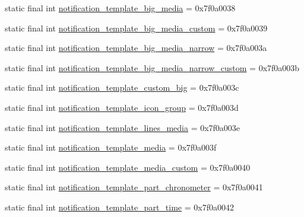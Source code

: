 \begin{DoxyCompactItemize}
\item 
static final int \mbox{\hyperlink{classandroid_1_1support_1_1design_1_1_r_1_1layout_a937801124bdcdd939ce59fe3913a9762}{notification\+\_\+template\+\_\+big\+\_\+media}} = 0x7f0a0038
\item 
static final int \mbox{\hyperlink{classandroid_1_1support_1_1design_1_1_r_1_1layout_ac48d0f30a65cf14a5d13026a68580c17}{notification\+\_\+template\+\_\+big\+\_\+media\+\_\+custom}} = 0x7f0a0039
\item 
static final int \mbox{\hyperlink{classandroid_1_1support_1_1design_1_1_r_1_1layout_a85e748195c9daddc8bb8fe726a1a5da2}{notification\+\_\+template\+\_\+big\+\_\+media\+\_\+narrow}} = 0x7f0a003a
\item 
static final int \mbox{\hyperlink{classandroid_1_1support_1_1design_1_1_r_1_1layout_ac5850f50d9b00b6d8bef8170ae46d560}{notification\+\_\+template\+\_\+big\+\_\+media\+\_\+narrow\+\_\+custom}} = 0x7f0a003b
\item 
static final int \mbox{\hyperlink{classandroid_1_1support_1_1design_1_1_r_1_1layout_a3f655a0c29e0f05b1530f853466714d2}{notification\+\_\+template\+\_\+custom\+\_\+big}} = 0x7f0a003c
\item 
static final int \mbox{\hyperlink{classandroid_1_1support_1_1design_1_1_r_1_1layout_af18dacccacfd30520ce9e95dffe3735c}{notification\+\_\+template\+\_\+icon\+\_\+group}} = 0x7f0a003d
\item 
static final int \mbox{\hyperlink{classandroid_1_1support_1_1design_1_1_r_1_1layout_aff5e95253f828cd42a503893c4e9dd6e}{notification\+\_\+template\+\_\+lines\+\_\+media}} = 0x7f0a003e
\item 
static final int \mbox{\hyperlink{classandroid_1_1support_1_1design_1_1_r_1_1layout_af6499fd4c261801e10b2e023556ceb2e}{notification\+\_\+template\+\_\+media}} = 0x7f0a003f
\item 
static final int \mbox{\hyperlink{classandroid_1_1support_1_1design_1_1_r_1_1layout_a73930b457283d5321064a22320c07cb4}{notification\+\_\+template\+\_\+media\+\_\+custom}} = 0x7f0a0040
\item 
static final int \mbox{\hyperlink{classandroid_1_1support_1_1design_1_1_r_1_1layout_adbf595dcbbe5468a640c75da765e94c5}{notification\+\_\+template\+\_\+part\+\_\+chronometer}} = 0x7f0a0041
\item 
static final int \mbox{\hyperlink{classandroid_1_1support_1_1design_1_1_r_1_1layout_a207f018f5184f266fb707b3c42dff303}{notification\+\_\+template\+\_\+part\+\_\+time}} = 0x7f0a0042
\item 

\end{DoxyCompactItemize}
